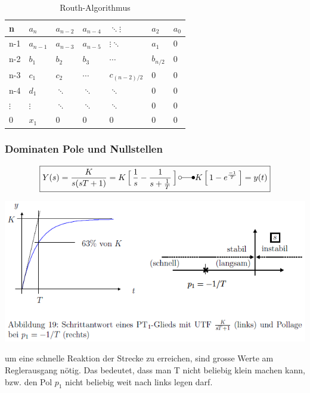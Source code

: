 \begin{table}
	\begin{tabularx}{0.6\textwidth}{|X||X|X|X|X|X|X|}
	\hline
		n & \cellcolor{hellgrau}$a_n$ & $a_{n-2}$ & $a_{n-4}$ & $\ddots\vdots$ & $a_{2}$  & $a_{0}$ \\ \hline
		n-1 & \cellcolor{hellgrau} $a_{n-1}$ & $a_{n-3}$ & $a_{n-5}$ & $\vdots\ddots$ & $a_{1}$  & 0 \\ \hline\hline
		n-2 & \cellcolor{hellgrau} $b_{1}$ & $b_{2}$ & $b_{3}$ & $\cdots$ & $b_{n/2}$  & 0 \\ \hline
		n-3 & \cellcolor{hellgrau} $c_{1}$ & $c_{2}$ & $\cdots$ & $c_{(n-2)/2}$ & 0 & 0 \\ \hline
		n-4 & \cellcolor{hellgrau} $d_{1}$ & $\ddots$ & $\ddots$ & $\ddots$ & 0 & 0 \\ \hline
		$\vdots$ & \cellcolor{hellgrau} $\vdots$ &  $\ddots$ & $\ddots$ & $\ddots$ & 0 & 0 \\ \hline
		0 & \cellcolor{hellgrau} $x_1$ & 0 & 0 & 0 & 0 & 0 \\ \hline
	\end{tabularx}
\caption{Routh-Algorithmus}
\end{table}

\subsubsection{Dominaten Pole und Nullstellen}

\begin{equation}
\boxed{Y(s)=\frac{K}{s(sT+1)}=K\mathop{\Big[}\frac{1}{s}-\frac{1}{s+\frac{1}{T}}\mathop{\Big]} \laplace K\mathop{\Big[}1-e^{\frac{-1}{T}}\mathop{\Big]}=y(t)}
\end{equation}
		\begin{center}
			\includegraphics[width=15cm]{./images/PoleNullstellen.png}
		\end{center}
um eine schnelle Reaktion der Strecke
zu erreichen, sind grosse Werte am Reglerausgang nötig. Das bedeutet, dass man
T nicht beliebig klein machen kann, bzw. den Pol $p_1$ nicht beliebig weit nach links
legen darf.\\


